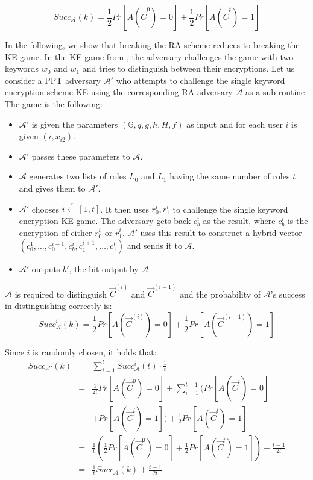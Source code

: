 \documentclass[epsfig,a4paper,11pt,titlepage]{book}
\numberwithin{algorithm}{chapter}
\begin{document}
\begin{equation}
Succ_{\mathcal{A}}(k) =\frac{1}{2}
Pr[A(\vec{C}^0) = 0] + \frac{1}{2}
Pr[A(\vec{C}^t) = 1]
\end{equation}

In the following, we show that breaking the \gls{RA} scheme reduces to breaking the \gls{KE} game. In the \gls{KE} game from \cite{Dong:2011}, the adversary challenges the game with two keywords $w_0$ and $w_1$ and tries to distinguish between their encryptions. Let us consider a \gls{PPT} adversary $\mathcal{A}'$ who attempts to challenge the single keyword encryption scheme \gls{KE} using the corresponding \gls{RA} adversary $\mathcal{A}$ as a sub-routine The game is the following:
\begin{itemize}
\item $\mathcal{A}'$ is given the parameters $(\mathbb{G},q,g,h,H,f)$ as input and for each user $i$ is given $(i,x_{i2})$.
\item $\mathcal{A}'$ passes these parameters to $\mathcal{A}$.
\item $\mathcal{A}$ generates two lists of roles $L_0$ and $L_1$ having the same number of roles  $t$ and gives them to $\mathcal{A}'$.
\item $\mathcal{A}'$ chooses $i \xleftarrow{r} [1, t]$. It then uses $r^i_0, r^i_1$ to challenge the single keyword encryption \gls{KE} game. The adversary gets back $c^i_b$ as the result, where $c^i_b$ is the encryption of either $r^i_0$ or $r^i_1$. $\mathcal{A}'$ uses this result to construct a hybrid vector $(c^1_0,\ldots, c^{i-1}_0, c_b^i, c_1^{i+1},\ldots,c^t_1)$ and sends it to $\mathcal{A}$.
\item $\mathcal{A}'$ outputs $b'$, the bit output by $\mathcal{A}$.
\end{itemize}

$\mathcal{A}$ is required to distinguish $\vec{C}^{(i)}$ and $\vec{C}^{(i-1)}$ and the probability of $\mathcal{A}$'s success in distinguishing correctly is:
\begin{equation}
Succ_{\mathcal{A}}^i(k) =\frac{1}{2}
Pr[A(\vec{C}^{(i)}) = 0] + \frac{1}{2}
Pr[A(\vec{C}^{(i-1)}) = 1]
\end{equation}

Since $i$ is randomly chosen, it holds that:
\noindent
\begin{equation}
\begin{array}{lll}
Succ_{\mathcal{A}'}(k) & = &\sum_{i=1}^tSucc_{\mathcal{A}}^i(t) \cdot \frac{1}{t} \\
& = &\frac{1}{2t}Pr[A(\vec{C}^0) = 0] + \sum_{i=1}^{t-1}(Pr[A(\vec{C}^i) = 0] \\
& & + Pr[A(\vec{C}^i) = 1]) + \frac{1}{2} Pr[A(\vec{C}^t) = 1] \\
& = & \frac{1}{t} (\frac{1}{2} Pr[A(\vec{C}^0) = 0] + \frac{1}{2} Pr[A(\vec{C}^t)=1]) + \frac{t-1}{2t} \\
& = & \frac{1}{t}Succ_{\mathcal{A}}(k) + \frac{t-1}{2t}
\end{array}
\end{equation}
\end{document}
